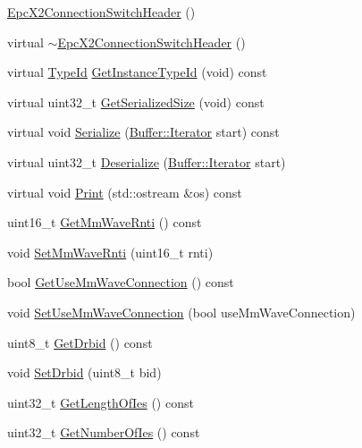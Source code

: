 \begin{DoxyCompactItemize}
\item 
\hyperlink{classns3_1_1EpcX2ConnectionSwitchHeader_ae84a499cffbd51c699df016da997715c}{Epc\+X2\+Connection\+Switch\+Header} ()
\item 
virtual \hyperlink{classns3_1_1EpcX2ConnectionSwitchHeader_ad369e978d4c3eb1480fe21505642e588}{$\sim$\+Epc\+X2\+Connection\+Switch\+Header} ()
\item 
virtual \hyperlink{classns3_1_1TypeId}{Type\+Id} \hyperlink{classns3_1_1EpcX2ConnectionSwitchHeader_ade5caf9d90a78a4d6cd00ba5b31486c5}{Get\+Instance\+Type\+Id} (void) const 
\item 
virtual uint32\+\_\+t \hyperlink{classns3_1_1EpcX2ConnectionSwitchHeader_a0ca4e54a4b847840885929c37b0c52db}{Get\+Serialized\+Size} (void) const 
\item 
virtual void \hyperlink{classns3_1_1EpcX2ConnectionSwitchHeader_a069d7d186c216f01af9233fe7bd04eaa}{Serialize} (\hyperlink{classns3_1_1Buffer_1_1Iterator}{Buffer\+::\+Iterator} start) const 
\item 
virtual uint32\+\_\+t \hyperlink{classns3_1_1EpcX2ConnectionSwitchHeader_ac8c9705aa6320cb49a5402867552c910}{Deserialize} (\hyperlink{classns3_1_1Buffer_1_1Iterator}{Buffer\+::\+Iterator} start)
\item 
virtual void \hyperlink{classns3_1_1EpcX2ConnectionSwitchHeader_accc2b56550842a275161ed4beadf2d83}{Print} (std\+::ostream \&os) const 
\item 
uint16\+\_\+t \hyperlink{classns3_1_1EpcX2ConnectionSwitchHeader_a449a49586287dbd09a72add934dddfcd}{Get\+Mm\+Wave\+Rnti} () const 
\item 
void \hyperlink{classns3_1_1EpcX2ConnectionSwitchHeader_a656132ef242bee059325ae336ee75f05}{Set\+Mm\+Wave\+Rnti} (uint16\+\_\+t rnti)
\item 
bool \hyperlink{classns3_1_1EpcX2ConnectionSwitchHeader_a4aa2a114588ec6926539934de4614bae}{Get\+Use\+Mm\+Wave\+Connection} () const 
\item 
void \hyperlink{classns3_1_1EpcX2ConnectionSwitchHeader_a3f349d2bb7f71534003681174203465c}{Set\+Use\+Mm\+Wave\+Connection} (bool use\+Mm\+Wave\+Connection)
\item 
uint8\+\_\+t \hyperlink{classns3_1_1EpcX2ConnectionSwitchHeader_afbd41f3a9e79c2548015d64d7a4770e5}{Get\+Drbid} () const 
\item 
void \hyperlink{classns3_1_1EpcX2ConnectionSwitchHeader_a7dbfb7e32cc68cb99c99a6a00fd2c5b5}{Set\+Drbid} (uint8\+\_\+t bid)
\item 
uint32\+\_\+t \hyperlink{classns3_1_1EpcX2ConnectionSwitchHeader_a80bc1fcdba98c917796c1493aacf7540}{Get\+Length\+Of\+Ies} () const 
\item 
uint32\+\_\+t \hyperlink{classns3_1_1EpcX2ConnectionSwitchHeader_a10ccd72f65efcefb53cb475a955f4abc}{Get\+Number\+Of\+Ies} () const 
\end{DoxyCompactItemize}
